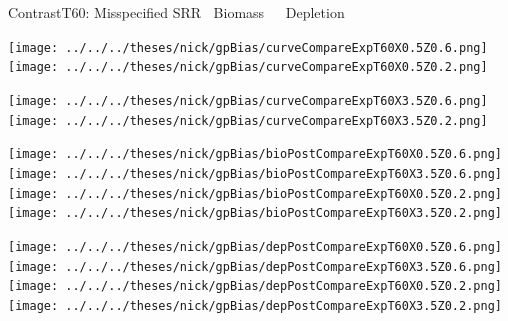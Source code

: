 \documentclass[ xcolor = pdftex, dvipsnames, table ]{beamer}
\begin{document}
%
\begin{frame}{ContrastT60: Misspecified SRR $~$ Biomass $~~~~$ Depletion}
$~$
\hspace*{-1.25cm}
\begin{minipage}[h!]{0.25\textwidth}
\texttt{[image: ../../../theses/nick/gpBias/curveCompareExpT60X0.5Z0.6.png]}\\
\texttt{[image: ../../../theses/nick/gpBias/curveCompareExpT60X0.5Z0.2.png]}
\end{minipage}
\begin{minipage}[h!]{0.25\textwidth}
\hspace*{0.45cm}
\texttt{[image: ../../../theses/nick/gpBias/curveCompareExpT60X3.5Z0.6.png]}\\
\hspace*{0.45cm}
\texttt{[image: ../../../theses/nick/gpBias/curveCompareExpT60X3.5Z0.2.png]}
\end{minipage}
\begin{minipage}[h!]{0.25\textwidth}
\vspace{-0.1cm}
\hspace*{1.5cm}
\texttt{[image: ../../../theses/nick/gpBias/bioPostCompareExpT60X0.5Z0.6.png]}\\
\hspace*{1.5cm}
\texttt{[image: ../../../theses/nick/gpBias/bioPostCompareExpT60X3.5Z0.6.png]}\\
\hspace*{1.5cm}
\texttt{[image: ../../../theses/nick/gpBias/bioPostCompareExpT60X0.5Z0.2.png]}\\
\hspace*{1.5cm}
\texttt{[image: ../../../theses/nick/gpBias/bioPostCompareExpT60X3.5Z0.2.png]}
\end{minipage}
\begin{minipage}[h!]{0.25\textwidth}
\vspace{-0.1cm}
\hspace*{1.5cm}
\texttt{[image: ../../../theses/nick/gpBias/depPostCompareExpT60X0.5Z0.6.png]}\\
\hspace*{1.5cm}
\texttt{[image: ../../../theses/nick/gpBias/depPostCompareExpT60X3.5Z0.6.png]}\\
\hspace*{1.5cm}
\texttt{[image: ../../../theses/nick/gpBias/depPostCompareExpT60X0.5Z0.2.png]}\\
\hspace*{1.5cm}
\texttt{[image: ../../../theses/nick/gpBias/depPostCompareExpT60X3.5Z0.2.png]}
\end{minipage}
\end{frame}
\end{document}
